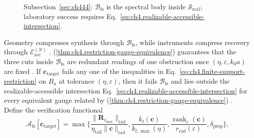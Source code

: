 \begin{figure}[t]
\centering
{}
\caption{Subsection~\ref{sec:ch444}: \(\mathcal{B}_{\mathrm{fs}}\) is the spectral body inside
\(\mathcal{S}_{\mathrm{real}}\); laboratory success requires
Eq.~\eqref{eq:ch4.realizable-accessible-intersection}.}
\label{fig:ch4.finite-support-restriction}
\end{figure}
Geometry compresses synthesis through \(\mathcal{B}_{\mathrm{fs}}\), while
instruments compress recovery through \(\mathcal{E}_{\mathrm{acc}}^{(N)}\) \cite{harrington2001}.
(\ref{thm:ch4.restriction-gauge-equivalence}) guarantees that the three cuts inside
\(\mathcal{B}_{\mathrm{fs}}\) are redundant readings of one obstruction once \((\eta,\varepsilon,k_{0}a)\) are fixed
\cite{hansen1988}.
\label{cor:ch4.gauge-redundant-check}
If \(\mathbf{c}_{\mathrm{target}}\) fails any one of the inequalities in
Eq.~\eqref{eq:ch4.finite-support-restriction} on \(B_{a}\) at tolerance \((\eta,\varepsilon)\), then it fails
\(\mathcal{B}_{\mathrm{fs}}\) and lies outside the realizable-accessible intersection
Eq.~\eqref{eq:ch4.realizable-accessible-intersection} for every equivalent gauge related by
(\ref{thm:ch4.restriction-gauge-equivalence}) \cite{hansen1988}.
Define the verification functional
\begin{equation}
\label{eq:ch4.unified-truncation-functional}
\mathcal{A}_{\mathrm{fs}}[\mathbf{c}_{\mathrm{target}}]
=
\max\Big\{
\frac{\|\mathbf{R}_{\ell_{\max}}\|_{\mathrm{rad}}}{\eta_{\mathrm{tail}}\|\mathbf{c}\|_{\mathrm{rad}}},
\frac{k_{t}(\mathbf{c})}{k_{t,\max}(\eta)},
\frac{\operatorname{rank}_{\varepsilon}(\mathbf{c})}{r_{\mathrm{rad}}(\varepsilon)},
\delta_{\mathrm{prop}}
\Big\},
\end{equation}
